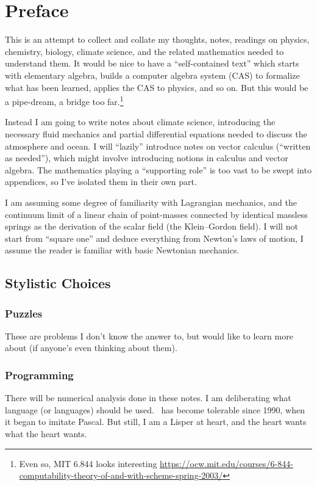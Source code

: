 \chapter*{Preface}

This is an attempt to collect and collate my thoughts, notes, readings
on physics, chemistry, biology, climate science, and the related
mathematics needed to understand them. It would be nice to have a
``self-contained text'' which starts with elementary algebra, builds a
computer algebra system (CAS) to formalize what has been learned,
applies the CAS to physics, and so on. But this would be a pipe-dream, a
bridge too far.\footnote{Even so, MIT 6.844 looks interesting \url{https://ocw.mit.edu/courses/6-844-computability-theory-of-and-with-scheme-spring-2003/}}

Instead I am going to write notes about climate science, introducing the
necessary fluid mechanics and partial differential equations needed to
discuss the atmosphere and ocean. I will ``lazily'' introduce notes on
vector calculus (``written as needed''), which might involve introducing
notions in calculus and vector algebra. The mathematics playing a
``supporting role'' is too vast to be swept into appendices, so I've
isolated them in their own part.

I am assuming some degree of familiarity with Lagrangian mechanics, and
the continuum limit of a linear chain of point-masses connected by
identical massless springs as the derivation of the scalar field (the
Klein--Gordon field). I will not start from ``square one'' and deduce
everything from Newton's laws of motion, I assume the reader is familiar
with basic Newtonian mechanics.

\section*{Stylistic Choices}

\subsection*{Puzzles} These are problems I don't know the answer to, but
would like to learn more about (if anyone's even thinking about them).

\subsection*{Programming} There will be numerical analysis done in these
notes. I am deliberating what language (or languages) should be
used. \FORTRAN\ has become tolerable since 1990, when it began to
imitate Pascal. But still, I am a Lisper at heart, and the heart wants
what the heart wants.

